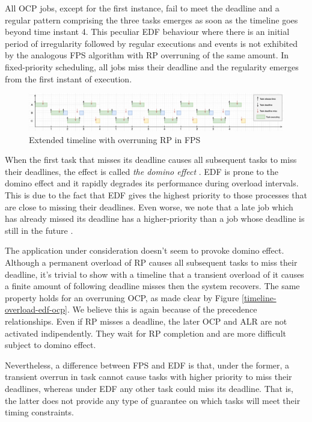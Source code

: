 \documentclass{article}
\begin{document}
All OCP jobs, except for the first instance, fail to meet the deadline and a regular pattern comprising the three tasks emerges as soon as the timeline goes beyond time instant 4. This peculiar EDF behaviour where there is an initial period of irregularity followed by regular executions and events is not exhibited by the analogous FPS algorithm with RP overruning of the same amount. In fixed-priority scheduling, all jobs miss their deadline and the regularity emerges from the first instant of execution.

\begin{figure}[!htbp]
\centering
\includegraphics[width=6.5in]{images/timeline-overload-fps-extended}
\caption{Extended timeline with overruning RP in FPS}
\label{timeline-overload-fps-extended}
\end{figure}

When the first task that misses its deadline causes all subsequent tasks to miss their deadlines, the effect is called \textit{the domino effect} \cite{value-deadline}. EDF is prone to the domino effect and it rapidly degrades its performance during overload intervals. This is due to the fact that EDF gives the highest priority to those processes that are close to missing their deadlines. Even worse, we note that a late job which has already missed its deadline has a higher-priority than a job whose deadline is still in the future \cite{fps-vs-edf}.

The application under consideration doesn't seem to provoke domino effect. Although a permanent overload of RP causes all subsequent tasks to miss their deadline, it's trivial to show with a timeline that a transient overload of it causes a finite amount of following deadline misses then the system recovers. The same property holds for an overruning OCP, as made clear by Figure \ref{timeline-overload-edf-ocp}. We believe this is again because of the precedence relationships. Even if RP misses a deadline, the later OCP and ALR are not activated indipendently. They wait for RP completion and are more difficult subject to domino effect.

Nevertheless, a difference between FPS and EDF is that, under the former, a transient overrun in task cannot cause tasks with higher priority to miss their deadlines, whereas under EDF any other task could miss its deadline. That is, the latter does not provide any type of guarantee on which tasks will meet their timing constraints.
\end{document}
